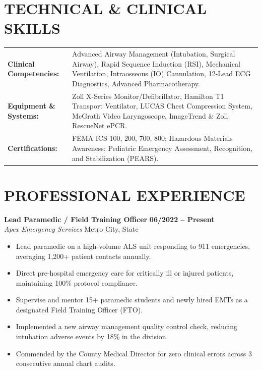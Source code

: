 \documentclass[10pt,letterpaper]{article}
\begin{document}
\section*{TECHNICAL \& CLINICAL SKILLS}
\begin{tabularx}{\textwidth}{@{}l X@{}}
\textbf{Clinical Competencies:} & Advanced Airway Management (Intubation, Surgical Airway), Rapid Sequence Induction (RSI), Mechanical Ventilation, Intraosseous (IO) Cannulation, 12-Lead ECG Diagnostics, Advanced Pharmacotherapy. \\
\textbf{Equipment \& Systems:} & Zoll X-Series Monitor/Defibrillator, Hamilton T1 Transport Ventilator, LUCAS Chest Compression System, McGrath Video Laryngoscope, ImageTrend \& Zoll RescueNet ePCR. \\
\textbf{Certifications:} & FEMA ICS 100, 200, 700, 800; Hazardous Materials Awareness; Pediatric Emergency Assessment, Recognition, and Stabilization (PEARS). \\
\end{tabularx}

\section*{PROFESSIONAL EXPERIENCE}

\noindent
\textbf{Lead Paramedic / Field Training Officer} \hfill \textbf{06/2022 -- Present} \\
\textit{Apex Emergency Services} \hfill Metro City, State
\begin{itemize}[leftmargin=*,nosep,topsep=2pt,itemsep=2pt]
    \item Lead paramedic on a high-volume ALS unit responding to 911 emergencies, averaging 1,200+ patient contacts annually.
    \item Direct pre-hospital emergency care for critically ill or injured patients, maintaining 100\% protocol compliance.
    \item Supervise and mentor 15+ paramedic students and newly hired EMTs as a designated Field Training Officer (FTO).
    \item Implemented a new airway management quality control check, reducing intubation adverse events by 18\% in the division.
    \item Commended by the County Medical Director for zero clinical errors across 3 consecutive annual chart audits.
\end{itemize}

\vspace{6pt}
\end{document}
